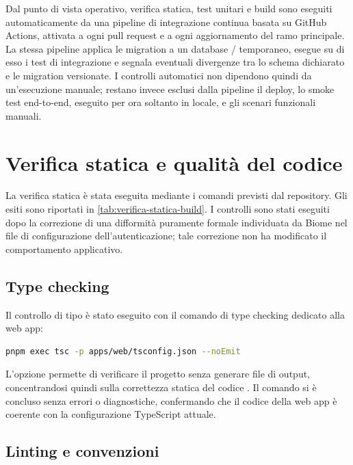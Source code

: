 Dal punto di vista operativo, verifica statica, test unitari e build sono eseguiti automaticamente da una pipeline di integrazione continua basata su GitHub Actions, attivata a ogni pull request e a ogni aggiornamento del ramo principale. La stessa pipeline applica le migration \prisma{} a un database \postgresql{}/\postgis{} temporaneo, esegue su di esso i test di integrazione e segnala eventuali divergenze tra lo schema dichiarato e le migration versionate. I controlli automatici non dipendono quindi da un'esecuzione manuale; restano invece esclusi dalla pipeline il deploy, lo smoke test end-to-end, eseguito per ora soltanto in locale, e gli scenari funzionali manuali.



\section{Verifica statica e qualità del codice}
\label{sec:verifica-statica}

La verifica statica è stata eseguita mediante i comandi previsti dal repository. Gli esiti sono riportati in \cref{tab:verifica-statica-build}. I controlli sono stati eseguiti dopo la correzione di una difformità puramente formale individuata da Biome nel file di configurazione dell'autenticazione; tale correzione non ha modificato il comportamento applicativo.

\subsection{Type checking}
\label{subsec:typechecking}

Il controllo di tipo è stato eseguito con il comando di type checking dedicato alla web app:

\begin{lstlisting}[language=bash]
pnpm exec tsc -p apps/web/tsconfig.json --noEmit
\end{lstlisting}

L'opzione  permette di verificare il progetto senza generare file di output, concentrandosi quindi sulla correttezza statica del codice \typescript{}. Il comando si è concluso senza errori o diagnostiche, confermando che il codice della web app è coerente con la configurazione TypeScript attuale.


\subsection{Linting e convenzioni}
\label{subsec:linting}

